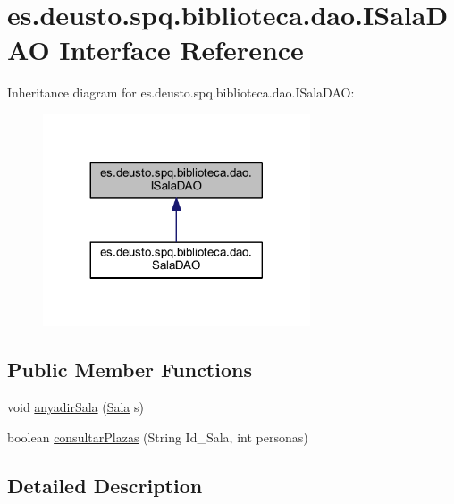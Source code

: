 \hypertarget{interfacees_1_1deusto_1_1spq_1_1biblioteca_1_1dao_1_1_i_sala_d_a_o}{}\section{es.\+deusto.\+spq.\+biblioteca.\+dao.\+I\+Sala\+D\+AO Interface Reference}
\label{interfacees_1_1deusto_1_1spq_1_1biblioteca_1_1dao_1_1_i_sala_d_a_o}


Inheritance diagram for es.\+deusto.\+spq.\+biblioteca.\+dao.\+I\+Sala\+D\+AO\+:
\nopagebreak
\begin{figure}[H]
\begin{center}
\leavevmode
\includegraphics[width=224pt]{interfacees_1_1deusto_1_1spq_1_1biblioteca_1_1dao_1_1_i_sala_d_a_o__inherit__graph}
\end{center}
\end{figure}
\subsection*{Public Member Functions}
\begin{DoxyCompactItemize}
\item 
void \mbox{\hyperlink{interfacees_1_1deusto_1_1spq_1_1biblioteca_1_1dao_1_1_i_sala_d_a_o_a20257b6e5501dd812441aa6795fcd24a}{anyadir\+Sala}} (\mbox{\hyperlink{classes_1_1deusto_1_1spq_1_1biblioteca_1_1data_1_1_sala}{Sala}} s)
\item 
boolean \mbox{\hyperlink{interfacees_1_1deusto_1_1spq_1_1biblioteca_1_1dao_1_1_i_sala_d_a_o_af12c5fe6a1abe11bc65e1118d991f926}{consultar\+Plazas}} (String Id\+\_\+\+Sala, int personas)
\end{DoxyCompactItemize}


\subsection{Detailed Description}


